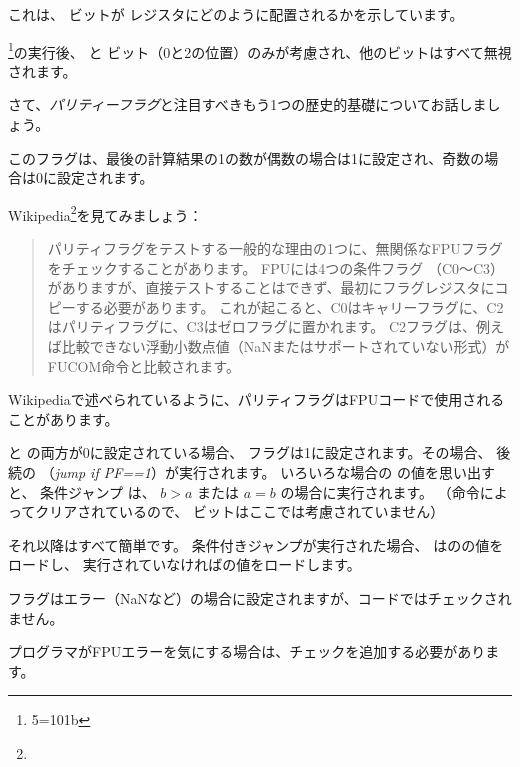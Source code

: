 

これは、 \CThreeBits ビットが \AH レジスタにどのように配置されるかを示しています。



\footnote{5=101b}の実行後、
\Czero と \Ctwo ビット（0と2の位置）のみが考慮され、他のビットはすべて無視されます。

\label{parity_flag}

さて、\emph{パリティーフラグ}と注目すべきもう1つの歴史的基礎についてお話しましょう。

このフラグは、最後の計算結果の1の数が偶数の場合は1に設定され、奇数の場合は0に設定されます。

Wikipedia\footnote{\WikipediaParityFlag}を見てみましょう：

\begin{framed}
\begin{quotation}
パリティフラグをテストする一般的な理由の1つに、無関係なFPUフラグをチェックすることがあります。 FPUには4つの条件フラグ
（C0～C3）がありますが、直接テストすることはできず、最初にフラグレジスタにコピーする必要があります。 
これが起こると、C0はキャリーフラグに、C2はパリティフラグに、C3はゼロフラグに置かれます。 
C2フラグは、例えば比較できない浮動小数点値（NaNまたはサポートされていない形式）がFUCOM命令と比較されます。
\end{quotation}
\end{framed}

Wikipediaで述べられているように、パリティフラグはFPUコードで使用されることがあります。


\Czero と \Ctwo の両方が0に設定されている場合、 \PF フラグは1に設定されます。その場合、
後続の \JP （\emph{jump if PF==1}）が実行されます。 
いろいろな場合の \CThreeBits の値を思い出すと、
条件ジャンプ \JP は、 $b>a$ または $a=b$ の場合に実行されます。
（命令によってクリアされているので、 \Cthree ビットはここでは考慮されていません）

それ以降はすべて簡単です。 
条件付きジャンプが実行された場合、
\FLD はのの値をロードし、
実行されていなければの値をロードします。


\Ctwo フラグはエラー（\gls{NaN}など）の場合に設定されますが、コードではチェックされません。

プログラマがFPUエラーを気にする場合は、チェックを追加する必要があります。


